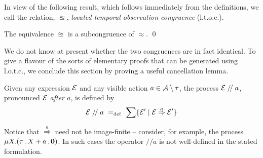 \documentclass[orivec,envcountsame]{llncs}
\newcommand{\Eq}{\approx}
\newcommand{\LTOC}{\approxeq}
\newcommand{\Weak}[1]{\stackrel{#1}{\Rightarrow}}
\newcommand{\After}[1]{\mathrel{/\!/} #1}
\begin{document}
In view of the following result, which follows immediately from the definitions,
we call the relation, $\LTOC$, \emph{located temporal observation congruence}
(l.t.o.c.). 

\begin{lemma}
The equivalence $\LTOC$ is a subcongruence of $\Eq$. \qed
\end{lemma}

We do not know at present whether the two congruences are in fact identical. To
give a flavour of the sorts of elementary proofs that can be generated using
l.o.t.c., we conclude this section by proving a useful cancellation lemma.

\begin{definition}
Given any expression $\text{$\mathcal{E}$}$ and any visible action $a \in \text{$\mathcal{A}$}\setminus\tau$, the process $\expr\After{a}$, pronounced \emph{$\text{$\mathcal{E}$}$ after $a$}, is defined by
\[
    \expr\After{a} \eqdef \sum \{ \expr' \mid \expr \Weak{a} \expr' \}
\]
\end{definition}

Notice that $\Weak{a}$ need not be image-finite -- consider, for example, the
process $\mu X .(\tau\,.\, X + a\,.\,\textbf{0})$. In such cases the operator
$\After{a}$ is not well-defined in the stated formulation.
\end{document}
